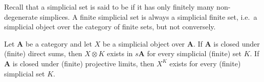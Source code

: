 \documentclass[../main]{subfiles}
\begin{document}
Recall that a simplicial set is said to be  if it has only finitely many non-degenerate simplices. A finite simplicial set is always a simplicial finite set, i.e.\ a simplicial object over the category of finite sets, but not conversely.

\begin{proposition}
\label{prop:2.1.02}
Let $\mathbf A$ be a category and let $X$ be a simplicial object over $\mathbf A$. If $\mathbf A$ is closed under (finite) direct sums, then $X \otimes K$ exists in $s\mathbf A$ for every simplicial (finite) set $K$. If $\mathbf A$ is closed under (finite) projective limits, then $X^K$ exists for every (finite) simplicial set $K$.
\end{proposition}
\end{document}
